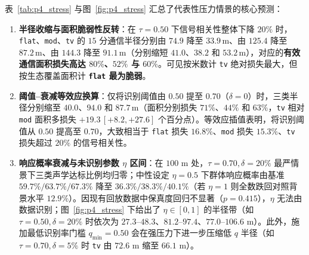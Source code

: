 \documentclass{apmcmthesis}
\begin{document}
表~\ref{tab:p4_stress} 与图~\ref{fig:p4_stress} 汇总了代表性压力情景的核心预测：
\begin{enumerate}
    \item \textbf{半径收缩与面积脆弱性反转}：在 $\tau = 0.50$ 下信号相关性整体下降 $20\%$ 时，\texttt{flat}、\texttt{mod}、\texttt{tv} 的 $15$ 分通信半径分别由 $74.9$ 降至 $33.9\,\mathrm{m}$、由 $125.4$ 降至 $87.2\,\mathrm{m}$、由 $144.3$ 降至 $91.1\,\mathrm{m}$（分别缩短 $41.0$、$38.2$ 和 $53.2\,\mathrm{m}$），对应的\textbf{有效通信面积损失高达 $80\%$、$52\%$ 与 $60\%$}。可见按米数计 \texttt{tv} 绝对损失最大，但按生态覆盖面积计 \textbf{\texttt{flat} 最为脆弱}。
    \item \textbf{阈值--衰减等效应换算}：仅将识别阈值由 $0.50$ 提至 $0.70$（$\delta=0$）时，三类半径分别缩至 $40.0$、$94.0$ 和 $87.7\,\mathrm{m}$（面积分别损失 $71\%$、$44\%$ 和 $63\%$，\texttt{tv} 相对 \texttt{mod} 面积多损失 $+19.3\,[+8.2, +27.6]$ 个百分点）。等效应插值表明，将识别阈值从 $0.50$ 提高至 $0.70$，大致相当于 \texttt{flat} 损失 $16.8\%$、\texttt{mod} 损失 $15.3\%$、\texttt{tv} 损失超过 $20\%$ 的信号相关性。
    \item \textbf{响应概率衰减与未识别参数 $\eta$ 区间}：在 $100\text{ m}$ 处，$\tau=0.70, \delta=20\%$ 最严情景下三类声学达标比例均归零；中性设定 $\eta = 0.5$ 下群体响应概率由基准 $59.7\% / 63.7\% / 67.3\%$ 降至 $36.3\% / 38.3\% / 40.1\%$（若 $\eta = 1$ 则全数跌回对照背景水平 $12.9\%$）。因现有回放数据中保真度回归不显著（$p=0.415$），$\eta$ 无法由数据识别；图~\ref{fig:p4_stress} 下给出了 $\eta \in [0, 1]$ 的半径带（如 $\tau=0.50, \delta=20\%$ 时依次为 $27.3\text{--}48.3$、$81.2\text{--}97.4$、$77.0\text{--}106.6\text{ m}$）。此外，施加最低识别率门槛 $q_{\min}=0.50$ 会在强压力下进一步压缩低 $q$ 半径（如 $\tau=0.70, \delta=5\%$ 时 \texttt{tv} 由 $72.6\text{ m}$ 缩至 $66.1\text{ m}$）。
\end{enumerate}
\end{document}
